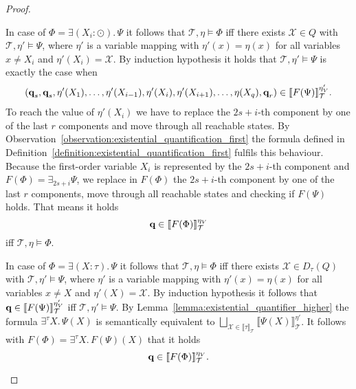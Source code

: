 \begin{proof}
\begin{compactitem}
        \item In case of $\Phi = \exists (X_i\colon \odot).\,\Psi$ it follows that $\mathcal{T}, \eta \models \Phi$ iff
        there exists  $\mathcal{X} \in Q$ with $\mathcal{T}, \eta' \models \Psi$, where $\eta'$ is a variable mapping with $\eta'(x) = \eta(x)$ for all variables $x \neq X_i$ and $\eta'(X_i) = \mathcal{X}$. By induction hypothesis it holds that $\mathcal{T}, \eta' \models \Psi$ is exactly the case when
        \begin{align*}
            (\emph{q}_s, \emph{q}_s, \eta'(X_1), \dots, \eta'(X_{i-1}), \eta'(X_i), \eta'(X_{i+1}), \dots, \eta(X_{q}), \emph{q}_r) \in
            \llbracket F(\Psi) \rrbracket^{{\eta'_V}}_\mathcal{T}.
        \end{align*}
        To reach the value of $\eta'(X_i)$ we have to replace the $2s+i$-th component by one of 
        the last $r$ components and move through all reachable states. By Observation~\ref{observation:existential_quantification_first} the formula defined in Definition~\ref{definition:existential_quantification_first} fulfils this behaviour. Because the first-order variable $X_i$ is represented by the $2s+i$-th component and $F(\Phi) = \exists_{2s+i} \Psi$, we replace in $F(\Phi)$ the $2s+i$-th component by one of the last $r$ components, move through all reachable states and checking if $F(\Psi)$ holds. That means it holds 
        \[\emph{q} \in \llbracket F
        (\Phi) \rrbracket^{\eta_V}_\mathcal{T}\]
        iff $\mathcal{T}, \eta \models \Phi$.

        \item In case of $\Phi = \exists (X \colon \tau).\,\Psi$ it follows that $\mathcal{T}, \eta \models \Phi$ iff
        there exists $\mathcal{X} \in D_\tau(Q)$ with $\mathcal{T}, \eta' \models \Psi$, where $\eta'$ is a variable mapping with $\eta'(x) = \eta(x)$ for all variables $x \neq X$ and $\eta'(X) = \mathcal{X}$.
        By induction hypothesis it follows that $\emph{q} \in
        \llbracket F(\Psi) \rrbracket^{{\eta'_V}}_\mathcal{T}$ iff $\mathcal{T}, \eta' \models \Psi$. By Lemma~\ref{lemma:existential_quantifier_higher} the formula $\exists^\tau X.\, \Psi(X)$ is semantically equivalent to
        $\underset{\mathcal{X} \in \llbracket \tau \rrbracket_\mathcal{T}}{\bigsqcup} \llbracket \Psi(X) \rrbracket^{\eta'}_\mathcal{T}$.
        It follows with $F(\Phi) = \exists^\tau X.\, F(\Psi)(X)$ that it holds \[\emph{q} \in
        \llbracket F(\Phi) \rrbracket^{\eta_V}_\mathcal{T}.\]


\end{compactitem}
\end{proof}
